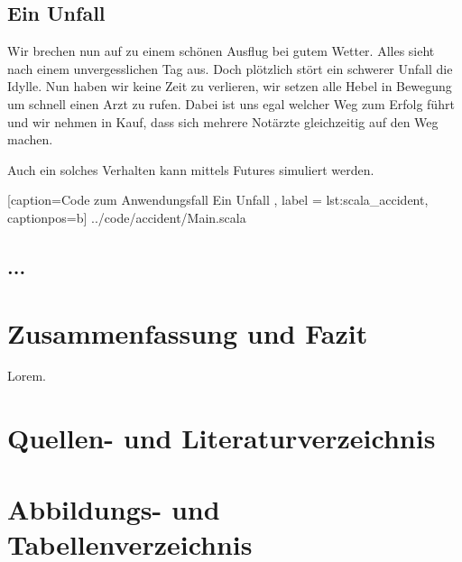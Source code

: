 \documentclass[11pt,a4paper,titlepage,ngerman]{scrartcl}
\begin{document}
\subsection{Ein Unfall}

Wir brechen nun auf zu einem schönen Ausflug bei gutem Wetter. Alles sieht
nach einem unvergesslichen Tag aus. Doch plötzlich stört ein schwerer Unfall
die Idylle. Nun haben wir keine Zeit zu verlieren, wir setzen alle Hebel in
Bewegung um schnell einen Arzt zu rufen. Dabei ist uns egal welcher
Weg zum Erfolg führt und wir nehmen in Kauf, dass sich mehrere Notärzte gleichzeitig
auf den Weg machen.

Auch ein solches Verhalten kann mittels Futures simuliert werden.


    [caption={Code zum Anwendungsfall \glqq Ein Unfall\grqq{} },
       label = lst:scala_accident,
       captionpos=b]
 {../code/accident/Main.scala}

\subsection{...}

\newpage
\section{Zusammenfassung und Fazit}

Lorem.

\newpage

\section{Quellen- und Literaturverzeichnis}




\section{Abbildungs- und Tabellenverzeichnis}

\renewcommand{\listfigurename}{Verzeichnis der Abbildungen}
\listoffigures

\newpage

\printglossary
\end{document}
